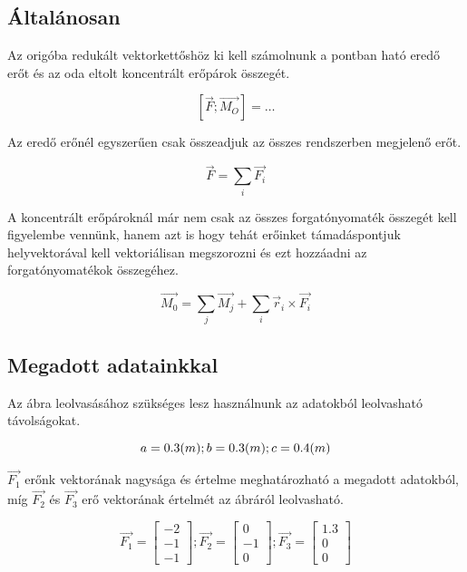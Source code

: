 
\subsection{Általánosan}

Az origóba redukált vektorkettőshöz ki kell számolnunk a pontban ható eredő erőt és az oda eltolt koncentrált erőpárok összegét.

$$[\vec{F}; \vec{M_O}] = \ldots$$

Az eredő erőnél egyszerűen csak összeadjuk az összes rendszerben megjelenő erőt.

$$\vec{F} = \sum_{i} \vec{F_i}$$

A koncentrált erőpároknál már nem csak az összes forgatónyomaték összegét kell figyelembe vennünk, hanem azt is hogy 
tehát erőinket támadáspontjuk helyvektorával kell vektoriálisan megszorozni és ezt hozzáadni az forgatónyomatékok összegéhez.

$$\vec{M_0} = \sum_{j} \vec{M_j} + \sum_{i} \vec{r}_i \times \vec{F_i}$$

\subsection{Megadott adatainkkal}

Az ábra leolvasásához szükséges lesz használnunk az adatokból leolvasható távolságokat.

$$
a = 0.3 (m); \space
b = 0.3 (m); \space
c = 0.4 (m)
$$

$\vec{F_1}$ erőnk vektorának nagysága és értelme meghatározható a megadott adatokból, míg $\vec{F_2}$ és $\vec{F_3}$ erő vektorának értelmét az ábráról leolvasható.

$$
\vec{F_1} = \begin{bmatrix} -2 \\ -1 \\ -1 \end{bmatrix};
\vec{F_2} = \begin{bmatrix} 0 \\ -1 \\ 0 \end{bmatrix};
\vec{F_3} = \begin{bmatrix} 1.3 \\ 0 \\ 0 \end{bmatrix}
$$

